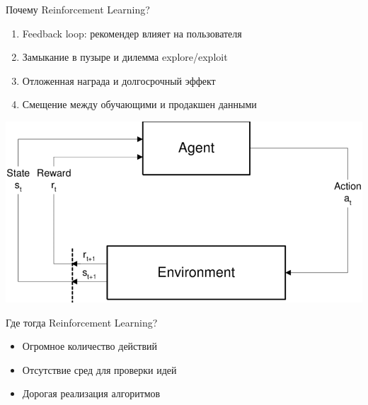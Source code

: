 \documentclass[11pt,aspectratio=169]{beamer}
\begin{document}
\begin{frame}{Почему Reinforcement Learning?}

\begin{tcolorbox}[colback=info!5,colframe=info!80,title=]
\begin{enumerate}
\item Feedback loop: рекомендер влияет на пользователя
\item Замыкание в пузыре и дилемма explore/exploit
\item Отложенная награда и долгосрочный эффект
\item Смещение между обучающими и продакшен данными
\end{enumerate}
\end{tcolorbox}

\vfill

\begin{center}
\includegraphics[scale=0.2]{images/rl.png}
\end{center}

\end{frame}

\begin{frame}{Где тогда Reinforcement Learning?}

\begin{tcolorbox}[colback=warn!5,colframe=warn!80,title=]
\begin{itemize}
\item Огромное количество действий
\item Отсутствие сред для проверки идей
\item Дорогая реализация алгоритмов
\end{itemize}
\end{tcolorbox}

\end{frame}
\end{document}
